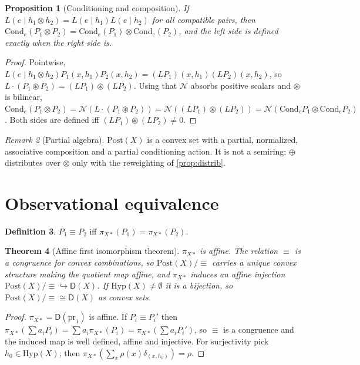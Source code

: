 \documentclass[11pt]{article}
\newtheorem{theorem}{Theorem}[section]
\newtheorem{proposition}[theorem]{Proposition}
\theoremstyle{definition}
\newtheorem{definition}[theorem]{Definition}
\theoremstyle{remark}
\newtheorem{remark}[theorem]{Remark}
\newcommand{\D}{\mathsf{D}}
\newcommand{\Hyp}{\mathrm{Hyp}}
\newcommand{\Post}{\mathrm{Post}}
\newcommand{\Cond}{\mathrm{Cond}}
\newcommand{\N}{\mathcal{N}}
\newcommand{\cp}{\circledast}
\begin{document}
\begin{proposition}[Conditioning and composition]\label{prop:cond-comp}
If $L(e\mid h_1\otimes h_2)=L(e\mid h_1)L(e\mid h_2)$ for all compatible pairs, then
$\Cond_e(P_1\otimes P_2)=\Cond_e(P_1)\otimes\Cond_e(P_2)$, and the left side is defined exactly when
the right side is.
\end{proposition}
\begin{proof}
Pointwise, $L(e\mid h_1\otimes h_2)P_1(x,h_1)P_2(x,h_2)=(LP_1)(x,h_1)(LP_2)(x,h_2)$, so
$L\cdot(P_1\cp P_2)=(LP_1)\cp(LP_2)$. Using that $\N$ absorbs positive scalars and $\cp$ is
bilinear, $\Cond_e(P_1\otimes P_2)=\N(L\cdot(P_1\cp P_2))=\N((LP_1)\cp(LP_2))
=\N(\Cond_eP_1\cp\Cond_eP_2)$. Both sides are defined iff $(LP_1)\cp(LP_2)\ne0$.
\end{proof}

\begin{remark}[Partial algebra]
$\Post(X)$ is a convex set with a partial, normalized, associative composition and a partial
conditioning action. It is not a semiring: $\oplus$ distributes over $\otimes$ only with the
reweighting of \cref{prop:distrib}.
\end{remark}

\section{Observational equivalence}\label{sec:obs}

\begin{definition}
$P_1\equiv P_2$ iff $\pi_{X*}(P_1)=\pi_{X*}(P_2)$.
\end{definition}

\begin{theorem}[Affine first isomorphism theorem]\label{thm:firstiso}
$\pi_{X*}$ is affine. The relation $\equiv$ is a congruence for convex combinations, so
$\Post(X)/{\equiv}$ carries a unique convex structure making the quotient map affine, and
$\pi_{X*}$ induces an affine injection $\Post(X)/{\equiv}\hookrightarrow\D(X)$. If
$\Hyp(X)\neq\emptyset$ it is a bijection, so $\Post(X)/{\equiv}\cong\D(X)$ as convex sets.
\end{theorem}
\begin{proof}
$\pi_{X*}=\D(\mathrm{pr}_1)$ is affine. If $P_i\equiv P_i'$ then
$\pi_{X*}(\sum a_iP_i)=\sum a_i\pi_{X*}(P_i)=\pi_{X*}(\sum a_iP_i')$, so $\equiv$ is a congruence and
the induced map is well defined, affine and injective. For surjectivity pick $h_0\in\Hyp(X)$; then
$\pi_{X*}(\sum_x\rho(x)\delta_{(x,h_0)})=\rho$.
\end{proof}
\end{document}
